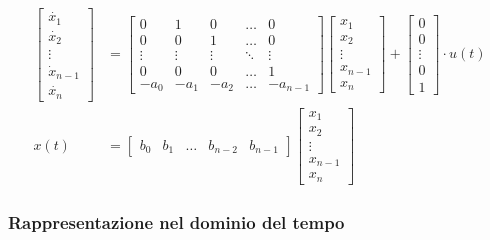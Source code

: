 \documentclass[11pt]{article}
\begin{document}
\begin{align*}
    \begin{bmatrix}
        \dot{x_1} \\
        \dot{x_2} \\
        \vdots \\
        \dot{x}_{n-1} \\
        \dot{x_n}
    \end{bmatrix}
    &= \begin{bmatrix}
        0 & 1 & 0 & \dots & 0 \\
        0 & 0 & 1 & \dots & 0 \\
        \vdots & \vdots & \vdots & \ddots & \vdots \\
        0 & 0 & 0 & \dots & 1 \\
        -a_0 & -a_1 & -a_2 & \dots & -a_{n-1}
    \end{bmatrix}
    \begin{bmatrix}
        x_1 \\
        x_2 \\ 
        \vdots \\
        x_{n-1} \\
        x_n
    \end{bmatrix}
    + \begin{bmatrix}
        0 \\
        0 \\
        \vdots \\
        0 \\
        1
    \end{bmatrix} \cdot u(t) \\
    x(t) &= \begin{bmatrix}
        b_0 & b_1 & \dots & b_{n-2} & b_{n-1}
    \end{bmatrix}
    \begin{bmatrix}
        x_1 \\
        x_2 \\
        \vdots \\
        x_{n-1} \\
        x_n
    \end{bmatrix}
\end{align*}

    \hypertarget{rappresentazione-nel-dominio-del-tempo}{%
\subsubsection{Rappresentazione nel dominio del
tempo}\label{rappresentazione-nel-dominio-del-tempo}}
\end{document}
